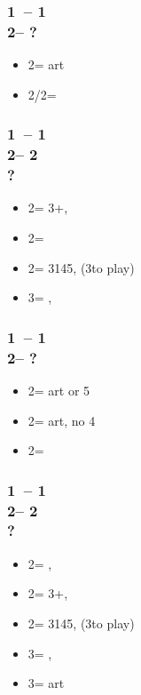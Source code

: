 \documentclass[12pt, a4paper]{article}
\begin{document}
\subsubsection*{1\clubs\ -- 1\hearts \\ 
                2\clubs -- ?}
\begin{itemize}
    \item 2\diams = \inv art \vimp
    \item 2\spades/2\nt = \gf
\end{itemize}

\subsubsection*{1\clubs\ -- 1\hearts \\ 
                2\clubs -- 2\diams\\
                ?}
\begin{itemize}
    \item 2\hearts = 3+\hearts, \fonce
    \item 2\spades = \gf
    \item 2\nt = 3145, \nf (3\diams to play)
    \item 3\clubs = \nat, \nf
\end{itemize}

\subsubsection*{1\clubs\ -- 1\spades \\ 
                2\clubs -- ?}
\begin{itemize}
    \item 2\diams = \inv art or 5\hearts \gf \vimp
    \item 2\hearts = \gf art, no 4\hearts \vimp
    \item 2\nt = \gf
\end{itemize}

\subsubsection*{1\clubs\ -- 1\spades \\ 
                2\clubs -- 2\diams\\
                ?}
\begin{itemize}
    \item 2\hearts = \nat, \fonce
    \item 2\spades = 3+\spades, \fonce
    \item 2\nt = 3145, \nf (3\diams to play)
    \item 3\clubs = \nat, \nf
    \item 3\diams = \gf art\vimp
\end{itemize}
\end{document}
